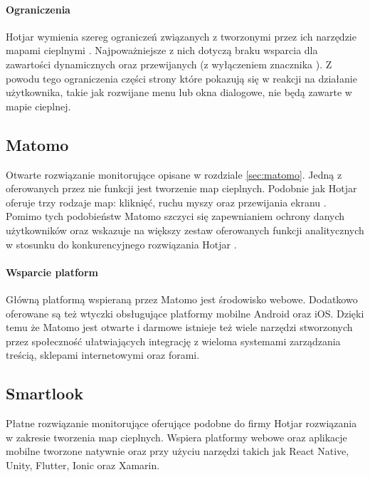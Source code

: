 \paragraph{Ograniczenia} 
Hotjar wymienia szereg ograniczeń związanych z tworzonymi przez ich narzędzie mapami cieplnymi \cite{Hotjar_limitations}. Najpoważniejsze z nich dotyczą braku wsparcia dla zawartości dynamicznych oraz przewijanych (z wyłączeniem znacznika ). Z powodu tego ograniczenia części strony które pokazują się w reakcji na działanie użytkownika, takie jak rozwijane menu lub okna dialogowe, nie będą zawarte w mapie cieplnej.

\subsection{Matomo}
Otwarte rozwiązanie monitorujące opisane w rozdziale \ref{sec:matomo}. Jedną z oferowanych przez nie funkcji jest tworzenie map cieplnych. Podobnie jak Hotjar oferuje trzy rodzaje map: kliknięć, ruchu myszy oraz przewijania ekranu \cite{Matomo_heatmaps}. Pomimo tych podobieństw Matomo szczyci się zapewnianiem ochrony danych użytkowników oraz wskazuje na większy zestaw oferowanych funkcji analitycznych w stosunku do konkurencyjnego rozwiązania Hotjar \cite{Matomo_hotjar}.

\paragraph{Wsparcie platform} 
Główną platformą wspieraną przez Matomo jest środowisko webowe. Dodatkowo oferowane są też wtyczki obsługujące platformy mobilne Android oraz iOS. Dzięki temu że Matomo jest otwarte i darmowe istnieje też wiele narzędzi stworzonych przez społeczność ułatwiających integrację z wieloma systemami zarządzania treścią, sklepami internetowymi oraz forami.

\subsection{Smartlook}
Płatne rozwiązanie monitorujące oferujące podobne do firmy Hotjar rozwiązania w zakresie tworzenia map cieplnych. Wspiera platformy webowe oraz aplikacje mobilne tworzone natywnie oraz przy użyciu narzędzi takich jak React Native, Unity, Flutter, Ionic oraz Xamarin.

